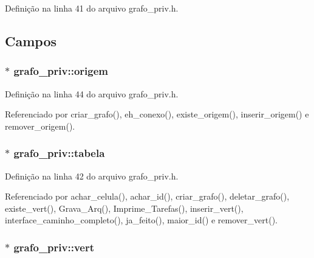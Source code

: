 Definição na linha 41 do arquivo grafo\+\_\+priv.\+h.



\subsection{Campos}
\hypertarget{structgrafo__priv_a49b9f7cfbed0b2dff3c5b373d79385db}{}
\subsubsection[{origem}]{$\ast$ grafo\+\_\+priv\+::origem}\label{structgrafo__priv_a49b9f7cfbed0b2dff3c5b373d79385db}


Definição na linha 44 do arquivo grafo\+\_\+priv.\+h.



Referenciado por criar\+\_\+grafo(), eh\+\_\+conexo(), existe\+\_\+origem(), inserir\+\_\+origem() e remover\+\_\+origem().

\hypertarget{structgrafo__priv_a7aaee4699517501a8ca504043ef78ddb}{}
\subsubsection[{tabela}]{$\ast$ grafo\+\_\+priv\+::tabela}\label{structgrafo__priv_a7aaee4699517501a8ca504043ef78ddb}


Definição na linha 42 do arquivo grafo\+\_\+priv.\+h.



Referenciado por achar\+\_\+celula(), achar\+\_\+id(), criar\+\_\+grafo(), deletar\+\_\+grafo(), existe\+\_\+vert(), Grava\+\_\+\+Arq(), Imprime\+\_\+\+Tarefas(), inserir\+\_\+vert(), interface\+\_\+caminho\+\_\+completo(), ja\+\_\+feito(), maior\+\_\+id() e remover\+\_\+vert().

\hypertarget{structgrafo__priv_a6f7e609364c2e69e02c56860b1a2c3ad}{}
\subsubsection[{vert}]{$\ast$ grafo\+\_\+priv\+::vert}\label{structgrafo__priv_a6f7e609364c2e69e02c56860b1a2c3ad}


